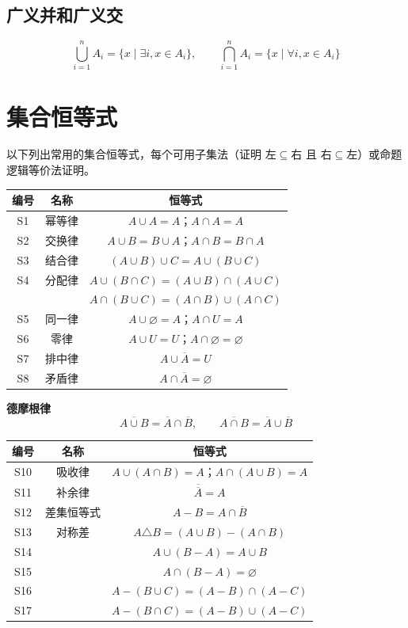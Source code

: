 \subsection{广义并和广义交}

\[
\bigcup_{i=1}^{n} A_i = \{x \mid \exists i, x \in A_i\},\qquad
\bigcap_{i=1}^{n} A_i = \{x \mid \forall i, x \in A_i\}
\]

\section{集合恒等式}

以下列出常用的集合恒等式，每个可用子集法（证明 $左 \subseteq 右$ 且 $右 \subseteq 左$）或命题逻辑等价法证明。

\begin{center}
\begin{tabular}{c|c|c}
\toprule
编号 & 名称 & 恒等式 \\
\midrule
S1 & 幂等律 & $A \cup A = A$；$A \cap A = A$ \\
S2 & 交换律 & $A \cup B = B \cup A$；$A \cap B = B \cap A$ \\
S3 & 结合律 & $(A \cup B) \cup C = A \cup (B \cup C)$ \\
S4 & 分配律 & $A \cup (B \cap C) = (A \cup B) \cap (A \cup C)$ \\
 &  & $A \cap (B \cup C) = (A \cap B) \cup (A \cap C)$ \\
S5 & 同一律 & $A \cup \varnothing = A$；$A \cap U = A$ \\
S6 & 零律 & $A \cup U = U$；$A \cap \varnothing = \varnothing$ \\
S7 & 排中律 & $A \cup \overline{A} = U$ \\
S8 & 矛盾律 & $A \cap \overline{A} = \varnothing$ \\
\bottomrule
\end{tabular}
\end{center}

\begin{myformula}
\textbf{德摩根律}
\[
\overline{A \cup B} = \overline{A} \cap \overline{B},\qquad
\overline{A \cap B} = \overline{A} \cup \overline{B}
\]
\end{myformula}

\begin{center}
\begin{tabular}{c|c|c}
\toprule
编号 & 名称 & 恒等式 \\
\midrule
S10 & 吸收律 & $A \cup (A \cap B) = A$；$A \cap (A \cup B) = A$ \\
S11 & 补余律 & $\overline{\overline{A}} = A$ \\
S12 & 差集恒等式 & $A - B = A \cap \overline{B}$ \\
S13 & 对称差 & $A \triangle B = (A \cup B) - (A \cap B)$ \\
S14 & & $A \cup (B - A) = A \cup B$ \\
S15 & & $A \cap (B - A) = \varnothing$ \\
S16 & & $A - (B \cup C) = (A - B) \cap (A - C)$ \\
S17 & & $A - (B \cap C) = (A - B) \cup (A - C)$ \\
\bottomrule
\end{tabular}
\end{center}

